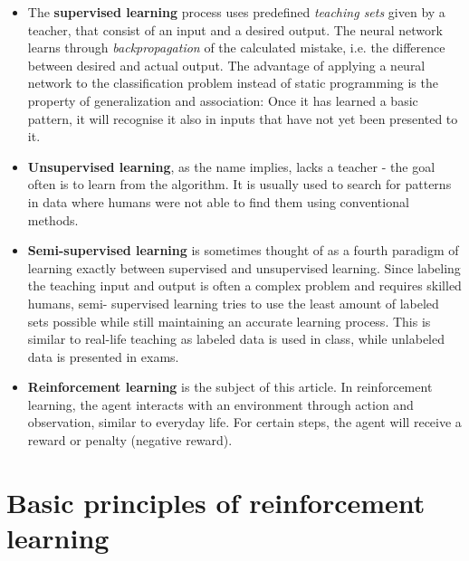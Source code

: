 \documentclass[12pt,a4]{article}
\begin{document}
\begin{itemize}
    
    \item The \textbf{supervised learning} process uses predefined \emph{teaching sets} given by a teacher, that consist of an input and a desired output. The neural network learns through \emph{backpropagation} of the calculated mistake, i.e. the difference between desired and actual output. The advantage of applying a neural network to the classification problem instead of static programming is the property of generalization and association: Once it has learned a basic pattern, it will recognise it also in inputs that have not yet been presented to it. \citep{wikiSupervisedLearning}
    
    \item \textbf{Unsupervised learning}, as the name implies, lacks a teacher - the goal often is to learn from the algorithm. It is usually used to search for patterns in data where humans were not able to find them using conventional methods.
    \citep{wikiUnsupervisedLearning}

    \item \textbf{Semi-supervised learning} is sometimes thought of as a fourth paradigm of learning exactly between supervised and unsupervised learning. Since labeling the teaching input and output is often a complex problem and requires skilled humans, semi- supervised learning tries to use the least amount of labeled sets possible while still maintaining an accurate learning process. This is similar to real-life teaching as labeled data is used in class, while unlabeled data is presented in exams. \citep{wikiSemisupervisedLearning}
    
     \item \textbf{Reinforcement learning} is the subject of this article. In reinforcement learning, the agent interacts with an environment through action and observation, similar to everyday life. For certain steps, the agent will receive a reward or penalty (negative reward). \citep{wikiRL}

\end{itemize}
\citep{typesofML}

\section{Basic principles of reinforcement learning}
\end{document}
